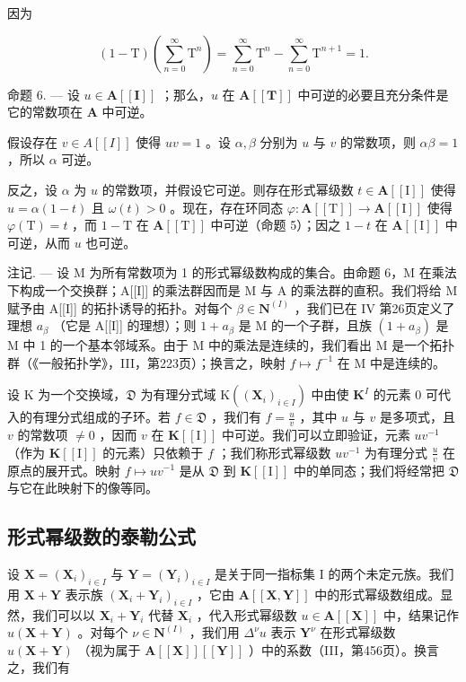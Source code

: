 因为

\[
(1 - \mathrm{T}) \left(\sum_ {n = 0} ^ {\infty} \mathrm{T} ^ {n}\right) = \sum_ {n = 0} ^ {\infty} \mathrm{T} ^ {n} - \sum_ {n = 0} ^ {\infty} \mathrm{T} ^ {n + 1} = 1.
\]

命题 6. --- 设 \(u \in \mathbf{A}[[\mathbf{I}]]\) ；那么，\(u\) 在 \(\mathbf{A}[[\mathbf{T}]]\) 中可逆的必要且充分条件是它的常数项在 \(\mathbf{A}\) 中可逆。

假设存在 \(v \in A[[I]]\) 使得 \(uv = 1\) 。设 \(\alpha, \beta\) 分别为 \(u\) 与 \(v\) 的常数项，则 \(\alpha\beta = 1\) ，所以 \(\alpha\) 可逆。

反之，设 \(\alpha\) 为 \(u\) 的常数项，并假设它可逆。则存在形式幂级数 \(t \in \mathbf{A}[[\mathrm{I}]]\) 使得 \(u = \alpha(1 - t)\) 且 \(\omega(t) > 0\) 。现在，存在环同态 \(\varphi: \mathbf{A}[[\mathrm{T}]] \to \mathbf{A}[[\mathrm{I}]]\) 使得 \(\varphi(\mathrm{T}) = t\) ，而 \(1 - \mathrm{T}\) 在 \(\mathbf{A}[[\mathrm{T}]]\) 中可逆（命题 5）；因之 \(1 - t\) 在 \(\mathbf{A}[[\mathrm{I}]]\) 中可逆，从而 \(u\) 也可逆。

注记. --- 设 M 为所有常数项为 1 的形式幂级数构成的集合。由命题 6，M 在乘法下构成一个交换群；A{[}{[}I{]}{]} 的乘法群因而是 M 与 A 的乘法群的直积。我们将给 M 赋予由 A{[}{[}I{]}{]} 的拓扑诱导的拓扑。对每个 \(\beta \in \mathbf{N}^{(I)}\) ，我们已在 IV 第26页定义了理想 \(a_{\beta}\) （它是 A{[}{[}I{]}{]} 的理想）；则 \(1 + a_{\beta}\) 是 M 的一个子群，且族 \((1 + a_{\beta})\) 是 M 中 1 的一个基本邻域系。由于 M 中的乘法是连续的，我们看出 M 是一个拓扑群（《一般拓扑学》，III，第223页）；换言之，映射 \(f \mapsto f^{-1}\) 在 M 中是连续的。

设 K 为一个交换域，\(\mathfrak{D}\) 为有理分式域 \(\mathrm{K}((\mathbf{X}_i)_{i\in I})\) 中由使 \(\mathbf{K}^I\) 的元素 0 可代入的有理分式组成的子环。若 \(f\in \mathfrak{D}\) ，我们有 \(f = \frac{u}{v}\) ，其中 \(u\) 与 \(v\) 是多项式，且 \(v\) 的常数项 \(\neq 0\) ，因而 \(v\) 在 \(\mathbf{K}[[\mathrm{I}]]\) 中可逆。我们可以立即验证，元素 \(uv^{-1}\) （作为 \(\mathbf{K}[[\mathrm{I}]]\) 的元素）只依赖于 \(f\) ；我们称形式幂级数 \(uv^{-1}\) 为有理分式 \(\frac{u}{v}\) 在原点的展开式。映射 \(f\mapsto uv^{-1}\) 是从 \(\mathfrak{D}\) 到 \(\mathbf{K}[[\mathrm{I}]]\) 中的单同态；我们将经常把 \(\mathfrak{D}\) 与它在此映射下的像等同。

\subsection{形式幂级数的泰勒公式}

设 \(\mathbf{X} = (\mathbf{X}_i)_{i\in I}\) 与 \(\mathbf{Y} = (\mathbf{Y}_i)_{i\in I}\) 是关于同一指标集 I 的两个未定元族。我们用 \(\mathbf{X} + \mathbf{Y}\) 表示族 \((\mathbf{X}_i + \mathbf{Y}_i)_{i\in I}\) ，它由 \(\mathbf{A}[[\mathbf{X},\mathbf{Y}]]\) 中的形式幂级数组成。显然，我们可以以 \(\mathbf{X}_i + \mathbf{Y}_i\) 代替 \(\mathbf{X}_i\) ，代入形式幂级数 \(u\in \mathbf{A}[[\mathbf{X}]]\) 中，结果记作 \(u(\mathbf{X} + \mathbf{Y})\) 。对每个 \(\nu \in \mathbf{N}^{(I)}\) ，我们用 \(\Delta^{\nu}u\) 表示 \(\mathbf{Y}^{\nu}\) 在形式幂级数 \(u(\mathbf{X} + \mathbf{Y})\) （视为属于 \(\mathbf{A}[[\mathbf{X}]][[\mathbf{Y}]]\) ）中的系数（III，第456页）。换言之，我们有

